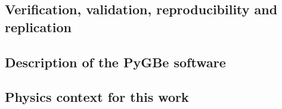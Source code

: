 
\subsection{Verification, validation, reproducibility and replication}

\subsection{Description of the PyGBe software}

\subsection{Physics context for this work}